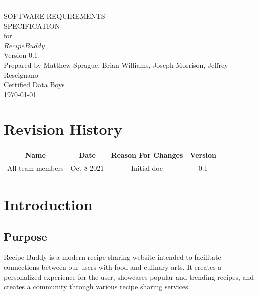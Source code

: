 \documentclass{scrreprt}
\def\myversion{0.1}
\begin{document}
\begin{flushright}
    \rule{16cm}{5pt}\vskip1cm
    \begin{bfseries}
        \Huge{SOFTWARE REQUIREMENTS\\ SPECIFICATION}\\
        \vspace{1.85cm}
        for\\
        \vspace{1.85cm}
        $Recipe Buddy$\\
        \vspace{1.8cm}
        \LARGE{Version \myversion}\\
        \vspace{1.8cm}
        Prepared by $ $Matthew Sprague, Brian Williams, Joseph Morrison, Jeffrey Rescignano$ $\\
        \vspace{1.8cm}
        $ $Certified Data Boys$ $\\
        \vspace{1.8cm}
        \today\\
    \end{bfseries}
\end{flushright}

\tableofcontents

\chapter*{Revision History}\label{revisions}

\begin{center}
    \begin{tabular}{c c c c}
        \midrule
        Name             & Date       & Reason For Changes & Version \\
        \midrule
        All team members & Oct 8 2021 & Initial doc        & 0.1     \\
        \midrule
    \end{tabular}
\end{center}

\chapter{Introduction}

\section{Purpose}
$ $\gls{Recipe Buddy} is a modern recipe sharing website intended to facilitate connections between our users with food and culinary arts.
It creates a personalized experience for the user, showcases popular and trending recipes, and creates a community through various recipe sharing services.$ $
\end{document}

